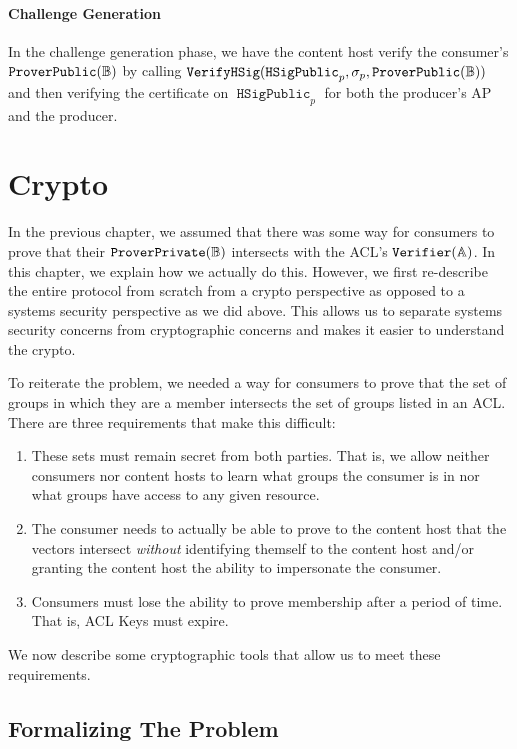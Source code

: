 \documentclass[pdftex,12pt,a4papaer,twoside,notitlepage]{report}
\DeclareMathOperator{\vh}{\mathtt{VerifyHSig}}
\DeclareMathOperator{\Hp}{\mathtt{HSigPublic}}
\begin{document}
\subsubsection{Challenge Generation}

In the challenge generation phase, we have the content host verify the
consumer's $\operatorname{\mathtt{ProverPublic}}(\mathbb{B})$ by calling $\vh(\Hp_p, \sigma_p, \Pv)$ and then verifying the
certificate on $\Hp_p$ for both the producer's AP and the producer.

\chapter{Crypto}
\label{chap:crypto}

In the previous chapter, we assumed that there was some way for consumers to
prove that their $\operatorname{\mathtt{ProverPrivate}}(\mathbb{B})$ intersects with the ACL's $\operatorname{\mathtt{Verifier}}(\mathbb{A})$. In this chapter, we
explain how we actually do this. However, we first re-describe the entire
protocol from scratch from a crypto perspective as opposed to a systems
security perspective as we did above. This allows us to separate systems
security concerns from cryptographic concerns and makes it easier to understand
the crypto.

To reiterate the problem, we needed a way for consumers to prove that the set of
groups in which they are a member intersects the set of groups listed in an ACL.
There are three requirements that make this difficult:

\begin{enumerate}
\item These sets must remain secret from both parties. That is, we allow neither
  consumers nor content hosts to learn what groups the consumer is in nor what
  groups have access to any given resource.
\item The consumer needs to actually be able to prove to the content host that
  the vectors intersect \emph{without} identifying themself to the content host
  and/or granting the content host the ability to impersonate the consumer.
\item Consumers must lose the ability to prove membership after a period of
  time. That is, ACL Keys must expire.
\end{enumerate}

We now describe some cryptographic tools that allow us to meet these
requirements.

\section{Formalizing The Problem}
\label{sec:reduce-to-math}
\end{document}
